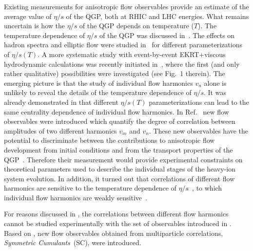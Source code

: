 Existing measurements for anisotropic flow observables provide an estimate of the average value of $\eta/s$ of the QGP, both at RHIC and LHC energies. What remains uncertain is how the $\eta/s$ of the QGP depends on temperature ($T$). The temperature dependence of $\eta/s$ of the QGP was discussed in~\cite{Csernai:2006zz}. The effects on hadron spectra and elliptic flow were studied in~\cite{Niemi:2011ix} for different parameterizations of $\eta/s(T)$.  A more systematic study with event-by-event EKRT+viscous hydrodynamic calculations was recently initiated in~\cite{Niemi:2015qia}, where the first (and only rather qualitative) possibilities were investigated (see Fig.~1 therein). The emerging picture is that the study of individual flow harmonics $v_n$ alone is unlikely to reveal the details of the temperature dependence of $\eta/s$.
It was already demonstrated in \cite{Niemi:2015qia} that different $\eta/s(T)$ parameterizations can lead to the same centrality dependence of individual flow harmonics. In Ref.~\cite{Niemi:2012aj} new flow observables were introduced which quantify the degree of correlation between amplitudes of two different harmonics $v_m$ and $v_n$. These new observables have the potential to discriminate between the contributions to anisotropic flow development from initial conditions and from the transport properties of the QGP~\cite{Niemi:2012aj}. Therefore their measurement would provide experimental constraints on theoretical parameters used to describe the individual stages of the heavy-ion system evolution. In addition, it turned out that correlations of different flow harmonics are sensitive to the temperature dependence of $\eta/s$~\cite{ALICE:2016kpq}, to which individual flow harmonics are weakly sensitive~\cite{Niemi:2015qia}. 
 
For reasons discussed in \cite{ALICE:2016kpq,Bilandzic:2013kga}, the correlations between different flow harmonics cannot be studied experimentally with the set of observables introduced in \cite{Niemi:2012aj}. 
Based on \cite{Bilandzic:2013kga}, new flow observables obtained from multiparticle correlations, \textit{Symmetric Cumulants}~(SC), were introduced. 


